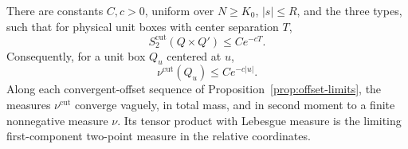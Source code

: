 \begin{lemma}
\label{lem:two-point-tails}
There are constants $C,c>0$, uniform over $N\ge K_0$, $|s|\le R$, and
the three types, such that for physical unit boxes with center
separation $T$,
\begin{equation}
 S_2^{\mathrm{cut}}(Q\times Q')\le Ce^{-cT}.
 \label{eq:offset-two-point-decay}
\end{equation}
Consequently, for a unit box $Q_u$ centered at $u$,
\begin{equation}
 \nu^{\mathrm{cut}}(Q_u)\le Ce^{-c|u|}.
 \label{eq:relative-unit-tail}
\end{equation}
Along each convergent-offset sequence of
Proposition~\ref{prop:offset-limits}, the measures
$\nu^{\mathrm{cut}}$ converge vaguely, in total mass, and in second
moment to a finite nonnegative measure $\nu$.  Its tensor product
with Lebesgue measure is the limiting first-component two-point
measure in the relative coordinates.
\end{lemma}

